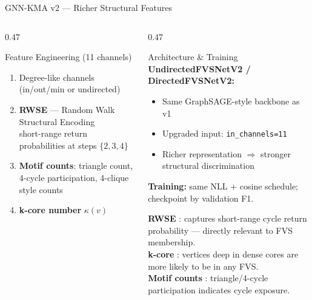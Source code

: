 \documentclass[aspectratio=169,10pt]{beamer}
\renewcommand{\footnotesize}{\tiny}
\begin{document}
\begin{frame}{GNN-KMA v2 — Richer Structural Features}
  \begin{columns}[T]
    \begin{column}{0.47\textwidth}
      \begin{block}{Feature Engineering (11 channels)}
        \begin{enumerate}\setlength\itemsep{2pt}
          \item Degree-like channels (in/out/min or undirected)
          \item \textbf{RWSE} — Random Walk Structural Encoding
            \cite{dwivedi2021}\\
            {\footnotesize short-range return probabilities at steps
             $\{2,3,4\}$}
          \item \textbf{Motif counts}: triangle count,
            4-cycle participation, 4-clique style counts \cite{ahmed2015}
          \item \textbf{k-core number} $\kappa(v)$ \cite{batagelj2003}
        \end{enumerate}
      \end{block}
    \end{column}
    \begin{column}{0.47\textwidth}
      \begin{block}{Architecture \& Training}
        \textbf{UndirectedFVSNetV2 / DirectedFVSNetV2:}
        \begin{itemize}
          \item Same GraphSAGE-style backbone as v1
          \item Upgraded input: \texttt{in\_channels=11}
          \item Richer representation $\Rightarrow$ stronger
            structural discrimination
        \end{itemize}
        \vspace{4pt}
        \textbf{Training:} same NLL + cosine schedule;
        checkpoint by validation F1.
      \end{block}
      \vspace{4pt}
      \begin{tcolorbox}[algbox,title=Why These Features?]
        \footnotesize
        \textbf{RWSE} \cite{dwivedi2021}: captures short-range cycle
        return probability — directly relevant to FVS membership.\\[3pt]
        \textbf{k-core} \cite{batagelj2003}: vertices deep in dense
        cores are more likely to be in any FVS.\\[3pt]
        \textbf{Motif counts} \cite{ahmed2015}: triangle/4-cycle
        participation indicates cycle exposure.
      \end{tcolorbox}
    \end{column}
  \end{columns}
\end{frame}
\end{document}
